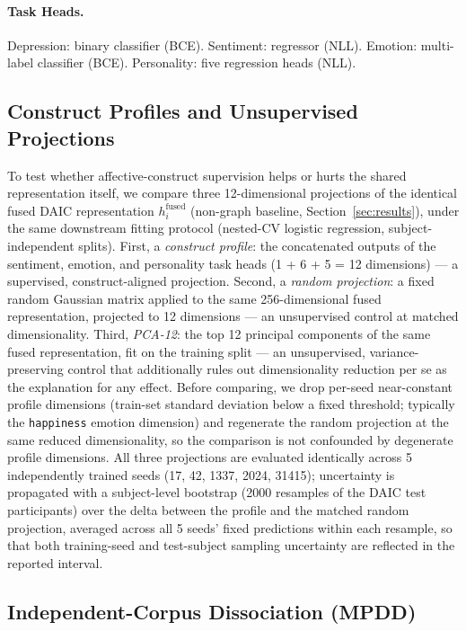 \documentclass[twocolumn]{article}
\begin{document}
\paragraph{Task Heads.} Depression: binary classifier (BCE). Sentiment: regressor (NLL). Emotion: multi-label classifier (BCE). Personality: five regression heads (NLL).

\subsection{Construct Profiles and Unsupervised Projections}
\label{sec:method-profile}

To test whether affective-construct supervision helps or hurts the shared representation itself, we compare three 12-dimensional projections of the identical fused DAIC representation $h_i^{\text{fused}}$ (non-graph baseline, Section~\ref{sec:results}), under the same downstream fitting protocol (nested-CV logistic regression, subject-independent splits). First, a \emph{construct profile}: the concatenated outputs of the sentiment, emotion, and personality task heads (1 + 6 + 5 = 12 dimensions) — a supervised, construct-aligned projection. Second, a \emph{random projection}: a fixed random Gaussian matrix applied to the same 256-dimensional fused representation, projected to 12 dimensions — an unsupervised control at matched dimensionality. Third, \emph{PCA-12}: the top 12 principal components of the same fused representation, fit on the training split — an unsupervised, variance-preserving control that additionally rules out dimensionality reduction per se as the explanation for any effect. Before comparing, we drop per-seed near-constant profile dimensions (train-set standard deviation below a fixed threshold; typically the \texttt{happiness} emotion dimension) and regenerate the random projection at the same reduced dimensionality, so the comparison is not confounded by degenerate profile dimensions. All three projections are evaluated identically across 5 independently trained seeds (17, 42, 1337, 2024, 31415); uncertainty is propagated with a subject-level bootstrap (2000 resamples of the DAIC test participants) over the delta between the profile and the matched random projection, averaged across all 5 seeds' fixed predictions within each resample, so that both training-seed and test-subject sampling uncertainty are reflected in the reported interval.

\subsection{Independent-Corpus Dissociation (MPDD)}
\label{sec:method-mpdd}
\end{document}
